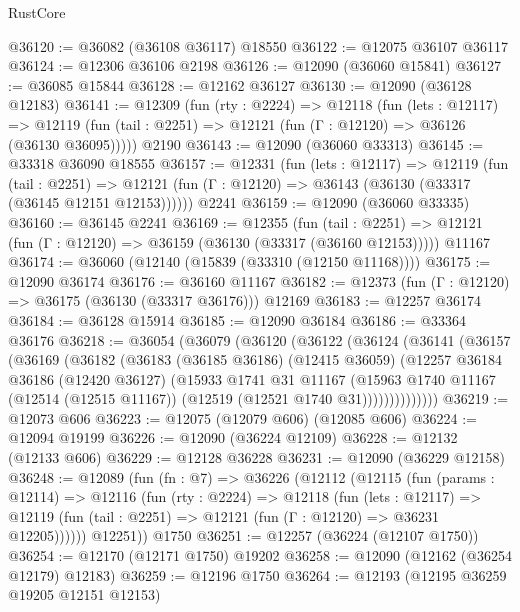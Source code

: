 \begin{lexlean}{RustCore}
\begin{coremodule}
@36120 := @36082 (@36108 @36117) @18550
@36122 := @12075 @36107 @36117
@36124 := @12306 @36106 @2198
@36126 := @12090 (@36060 @15841)
@36127 := @36085 @15844
@36128 := @12162 @36127
@36130 := @12090 (@36128 @12183)
@36141 := @12309
    (fun (rty : @2224) =>
    @12118
      (fun (lets : @12117) =>
      @12119 (fun (tail : @2251) => @12121 (fun (Γ : @12120) => @36126 (@36130 @36095)))))
    @2190
@36143 := @12090 (@36060 @33313)
@36145 := @33318 @36090 @18555
@36157 := @12331
    (fun (lets : @12117) =>
    @12119
      (fun (tail : @2251) =>
      @12121 (fun (Γ : @12120) => @36143 (@36130 (@33317 (@36145 @12151 @12153))))))
    @2241
@36159 := @12090 (@36060 @33335)
@36160 := @36145 @2241
@36169 := @12355
    (fun (tail : @2251) => @12121 (fun (Γ : @12120) => @36159 (@36130 (@33317 (@36160 @12153)))))
    @11167
@36174 := @36060 (@12140 (@15839 (@33310 (@12150 @11168))))
@36175 := @12090 @36174
@36176 := @36160 @11167
@36182 := @12373 (fun (Γ : @12120) => @36175 (@36130 (@33317 @36176))) @12169
@36183 := @12257 @36174
@36184 := @36128 @15914
@36185 := @12090 @36184
@36186 := @33364 @36176
@36218 := @36054
    (@36079
      (@36120
        (@36122
          (@36124
            (@36141
              (@36157
                (@36169
                  (@36182
                    (@36183
                      (@36185 @36186)
                      (@12415 @36059)
                      (@12257
                        @36184
                        @36186
                        (@12420 @36127)
                        (@15933
                          @1741
                          @31
                          @11167
                          (@15963
                            @1740
                            @11167
                            (@12514 (@12515 @11167))
                            (@12519 (@12521 @1740 @31))))))))))))))
@36219 := @12073 @606
@36223 := @12075 (@12079 @606) (@12085 @606)
@36224 := @12094 @19199
@36226 := @12090 (@36224 @12109)
@36228 := @12132 (@12133 @606)
@36229 := @12128 @36228
@36231 := @12090 (@36229 @12158)
@36248 := @12089
    (fun (fn : @7) =>
    @36226
      (@12112
        (@12115
          (fun (params : @12114) =>
          @12116
            (fun (rty : @2224) =>
            @12118
              (fun (lets : @12117) =>
              @12119 (fun (tail : @2251) => @12121 (fun (Γ : @12120) => @36231 @12205))))))
        @12251))
    @1750
@36251 := @12257 (@36224 (@12107 @1750))
@36254 := @12170 (@12171 @1750) @19202
@36258 := @12090 (@12162 (@36254 @12179) @12183)
@36259 := @12196 @1750
@36264 := @12193 (@12195 @36259 @19205 @12151 @12153)

\end{coremodule}
\end{lexlean}
